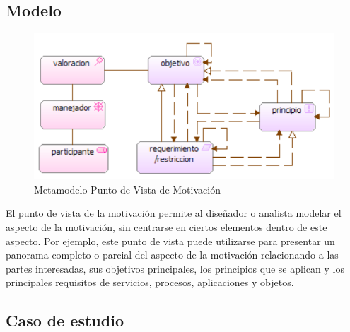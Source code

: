 \subsection{Modelo}
\begin{figure}[th!]
	\centering
	\includegraphics[width=0.5\linewidth]{arquitectura/imagenes/modeloMotivacion}
	\caption{Metamodelo Punto de Vista de Motivación}
	\label{metamodelo motivacion}
\end{figure}
El punto de vista de la motivación permite al diseñador o analista modelar el aspecto de la motivación, sin centrarse en ciertos elementos dentro de este aspecto. Por ejemplo, este punto de vista puede utilizarse para presentar un panorama completo o parcial del aspecto de la motivación relacionando a las partes interesadas, sus objetivos principales, los principios que se aplican y los principales requisitos de servicios, procesos, aplicaciones y objetos.

\subsection{Caso de estudio}

\newpage

